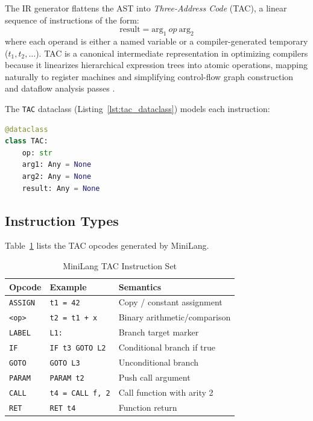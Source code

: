 \documentclass[conference]{IEEEtran}
\begin{document}
The IR generator flattens the AST into \textit{Three-Address Code}
(TAC), a linear sequence of instructions of the form:
\[
  \text{result} = \text{arg}_1\ \mathit{op}\ \text{arg}_2
\]
where each operand is either a named variable or a
compiler-generated temporary ($t_1, t_2, \ldots$). TAC is a canonical
intermediate representation in optimizing compilers \cite{dragon_book, muchnick1997}
because it linearizes hierarchical expression trees into atomic operations,
mapping naturally to register machines and simplifying control-flow graph
construction and dataflow analysis passes \cite{cytron1991}.

The \texttt{TAC} dataclass (Listing~\ref{lst:tac_dataclass}) models each
instruction:

\begin{lstlisting}[language=Python, caption={TAC instruction dataclass},
                   label={lst:tac_dataclass}, numbers=none]
@dataclass
class TAC:
    op: str
    arg1: Any = None
    arg2: Any = None
    result: Any = None
\end{lstlisting}

\subsection{Instruction Types}

Table~\ref{tab:tac_ops} lists the TAC opcodes generated by MiniLang.

\begin{table}[htbp]
\caption{MiniLang TAC Instruction Set}
\label{tab:tac_ops}
\centering
\renewcommand{\arraystretch}{1.2}
\begin{tabular}{@{}p{1.5cm}p{2.5cm}p{3.5cm}@{}}
\toprule
\textbf{Opcode} & \textbf{Example} & \textbf{Semantics} \\
\midrule
\texttt{ASSIGN}  & \texttt{t1 = 42}         & Copy / constant assignment \\
\texttt{<op>}    & \texttt{t2 = t1 + x}     & Binary arithmetic/comparison \\
\texttt{LABEL}   & \texttt{L1:}             & Branch target marker \\
\texttt{IF}      & \texttt{IF t3 GOTO L2}   & Conditional branch if true \\
\texttt{GOTO}    & \texttt{GOTO L3}         & Unconditional branch \\
\texttt{PARAM}   & \texttt{PARAM t2}        & Push call argument \\
\texttt{CALL}    & \texttt{t4 = CALL f, 2}  & Call function with arity 2 \\
\texttt{RET}     & \texttt{RET t4}          & Function return \\
\bottomrule
\end{tabular}
\end{table}
\end{document}
